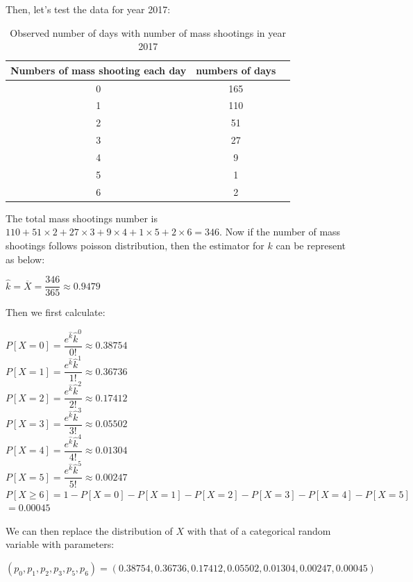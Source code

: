 \documentclass[12pt]{article}
\begin{document}
\par Then, let's test the data for year 2017:
\begin{table} [!htbp]
\begin{center}
\begin{tabular*} {14cm} {@{\extracolsep{\fill} }ccc}
\toprule
Numbers of mass shooting each day & numbers of days \\
\midrule
0 & 165 \\ \hline
1 & 110 \\ \hline
2 & 51\\ \hline
3 & 27 \\ \hline
4 & 9  \\ \hline
5 & 1  \\ \hline
6 & 2  \\
\bottomrule
\end{tabular*}
\end{center}
\caption{Observed number of days with number of mass shootings in year 2017}
\end{table}
\par The total mass shootings number is $110+51\times2+27\times3+9\times4+1\times5+2\times6=346$. Now if the number of mass shootings follows poisson distribution, then the estimator for $k$ can be represent as below:
\begin{center}
$\hat k=\overline X=\dfrac{346}{365} \approx0.9479$
\end{center}
\par Then we first calculate:
\begin{center}
$P[X=0]=\dfrac{e^{\hat k}\hat k^0}{0!} \approx0.38754$\\
$P[X=1]=\dfrac{e^{\hat k}\hat k^1}{1!} \approx0.36736$\\
$P[X=2]=\dfrac{e^{\hat k}\hat k^2}{2!} \approx0.17412$\\
$P[X=3]=\dfrac{e^{\hat k}\hat k^3}{3!} \approx0.05502$\\
$P[X=4]=\dfrac{e^{\hat k}\hat k^4}{4!} \approx0.01304$\\
$P[X=5]=\dfrac{e^{\hat k}\hat k^5}{5!} \approx0.00247$\\
$P[X\geq6]=1-P[X=0]-P[X=1]-P[X=2]-P[X=3]-P[X=4]-P[X=5]$\\
$=0.00045$
\end{center}
\par We can then replace the distribution of $X$ with that of a categorical random variable with parameters:
\begin{center}
$(p_0,p_1,p_2,p_3,p_5,p_6)=(0.38754,0.36736,0.17412,0.05502,0.01304,0.00247,0.00045)$
\end{center}
\end{document}
